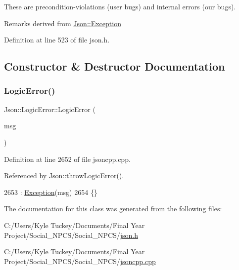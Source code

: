 These are precondition-\/violations (user bugs) and internal errors (our bugs).

\begin{DoxyRemark}{Remarks}
derived from \hyperlink{class_json_1_1_exception}{Json\+::\+Exception} 
\end{DoxyRemark}


Definition at line 523 of file json.\+h.



\subsection{Constructor \& Destructor Documentation}
\mbox{\label{class_json_1_1_logic_error_acca679aa49768a4a1de7b705c67c2919}} 
\subsubsection{\texorpdfstring{Logic\+Error()}{LogicError()}}
{\footnotesize\ttfamily Json\+::\+Logic\+Error\+::\+Logic\+Error (\begin{DoxyParamCaption}\item[{\hyperlink{json_8h_a1e723f95759de062585bc4a8fd3fa4be}{J\+S\+O\+N\+C\+P\+P\+\_\+\+S\+T\+R\+I\+NG} const \&}]{msg }\end{DoxyParamCaption})}



Definition at line 2652 of file jsoncpp.\+cpp.



Referenced by Json\+::throw\+Logic\+Error().


\begin{DoxyCode}
2653   : \hyperlink{class_json_1_1_exception_ae764aa42e0755bd4ce9d303e2733fa8f}{Exception}(msg)
2654 \{\}
\end{DoxyCode}


The documentation for this class was generated from the following files\+:\begin{DoxyCompactItemize}
\item 
C\+:/\+Users/\+Kyle Tuckey/\+Documents/\+Final Year Project/\+Social\+\_\+\+N\+P\+C\+S/\+Social\+\_\+\+N\+P\+C\+S/\hyperlink{json_8h}{json.\+h}\item 
C\+:/\+Users/\+Kyle Tuckey/\+Documents/\+Final Year Project/\+Social\+\_\+\+N\+P\+C\+S/\+Social\+\_\+\+N\+P\+C\+S/\hyperlink{jsoncpp_8cpp}{jsoncpp.\+cpp}\end{DoxyCompactItemize}
